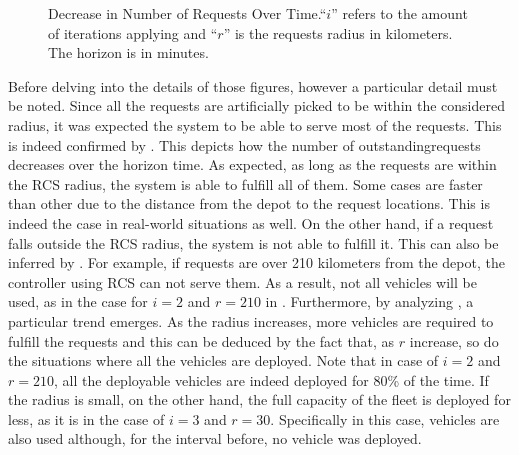 \begin{figure}[t]
	\caption[Decrease in Number of Requests Over Time]{Decrease in Number of Requests Over Time.``$i$'' refers to the amount of iterations applying  and ``$r$'' is the requests radius in kilometers. The horizon is in minutes. }
	\label{fig:requests_km_r}
\end{figure}
Before delving into the details of those figures, however a particular detail must be noted. Since all the requests are artificially picked to be within the considered radius, it was expected the system to be able to serve most of the requests. This is indeed confirmed by . This depicts how the number of outstandingrequests decreases over the horizon time. As expected, as long as the requests are within the RCS radius, the system is able to fulfill all of them. Some cases are faster than other due to the distance from the depot to the request locations. This is indeed the case in real-world situations as well. On the other hand, if a request falls outside the RCS radius, the system is not able to fulfill it. This can also be inferred by . For example, if requests are over 210 kilometers from the depot, the controller using RCS can not serve them. As a result, not all vehicles will be used, as in the case for $i=2$ and $r=210$ in . Furthermore, by analyzing , a particular trend emerges. As the radius increases, more vehicles are required to fulfill the requests and this can be deduced by the fact that, as $r$ increase, so do the situations where all the vehicles are deployed. Note that in case of $i=2$ and $r=210$, all the deployable vehicles are indeed deployed for 80\% of the time. If the radius is small, on the other hand, the full capacity of the fleet is deployed for less, as it is in the case of $i=3$ and $r=30$. Specifically in this case, vehicles are also used although, for the interval before, no vehicle was deployed. 




